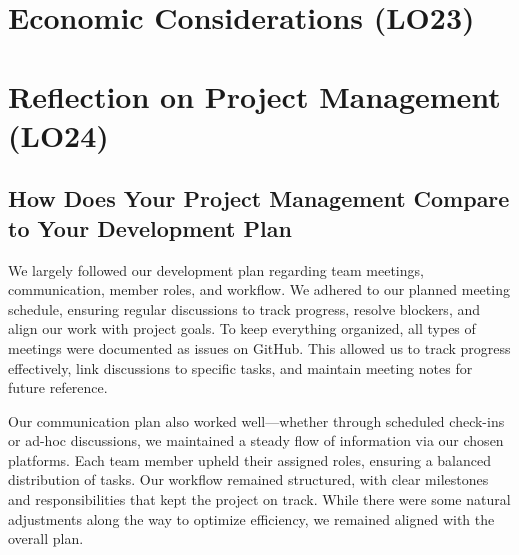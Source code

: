 \documentclass{article}
\begin{document}

\section{Economic Considerations (LO23)}


\section{Reflection on Project Management (LO24)}


\subsection{How Does Your Project Management Compare to Your Development Plan}


We largely followed our development plan regarding team meetings, communication, 
member roles, and workflow. We adhered to our planned meeting schedule, ensuring regular 
discussions to track progress, resolve blockers, and align our work with project goals. 
To keep everything organized, all types of meetings were documented as issues on GitHub. 
This allowed us to track progress effectively, link discussions to specific tasks, and 
maintain meeting notes for future reference.

Our communication plan also worked well—whether through scheduled check-ins or ad-hoc 
discussions, we maintained a steady flow of information via our chosen platforms. Each 
team member upheld their assigned roles, ensuring a balanced distribution of tasks. Our 
workflow remained structured, with clear milestones and responsibilities that kept the 
project on track. While there were some natural adjustments along the way to optimize 
efficiency, we remained aligned with the overall plan.
\end{document}
